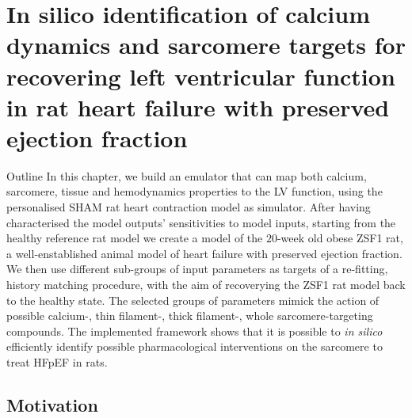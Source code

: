 \chapter{In silico identification of calcium dynamics and sarcomere targets for recovering left ventricular function in rat heart failure with preserved ejection fraction}\label{cha:chapter7}
%
%
%
\begin{remark}{Outline}
    In this chapter, we build an emulator that can map both calcium, sarcomere, tissue and hemodynamics properties to the LV function, using the personalised SHAM rat heart contraction model as simulator. After having characterised the model outputs' sensitivities to model inputs, starting from the healthy reference rat model we create a model of the $20$-week old obese ZSF1 rat, a well-enstablished animal model of heart failure with preserved ejection fraction. We then use different sub-groups of input parameters as targets of a re-fitting, history matching procedure, with the aim of recoverying the ZSF1 rat model back to the healthy state. The selected groups of parameters mimick the action of possible calcium-, thin filament-, thick filament-, whole sarcomere-targeting compounds. The implemented framework shows that it is possible to \textit{in silico} efficiently identify possible pharmacological interventions on the sarcomere to treat HFpEF in rats.
\end{remark}


%
%
%
\section{Motivation}\label{sec:ch7motivation}

